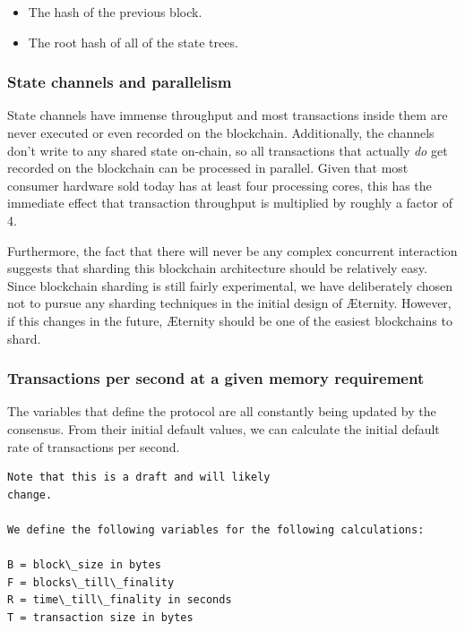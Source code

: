\documentclass[a4paper, 10pt, conference]{ieeeconf}      %
\begin{document}
\begin{draft}
\begin{itemize}
\item The hash of the previous block.
\item The root hash of all of the state trees.
\end{itemize}

\subsubsection{State channels and parallelism}
State channels have immense throughput and most transactions inside them are never executed or even recorded on the blockchain. Additionally, the channels don't write to any shared state on-chain, so all transactions that actually \emph{do} get recorded on the blockchain can be processed in parallel. Given that most consumer hardware sold today has at least four processing cores, this has the immediate effect that transaction throughput is multiplied by roughly a factor of 4.

Furthermore, the fact that there will never be any complex concurrent interaction suggests that sharding this blockchain architecture should be relatively easy. Since blockchain sharding is still fairly experimental, we have deliberately chosen not to pursue any sharding techniques in the initial design of Æternity. However, if this changes in the future, Æternity should be one of the easiest blockchains to shard.


\begin{sketch}
\subsubsection{Transactions per second at a given memory requirement}
The variables that define the protocol are all constantly being updated by the consensus. From their initial default values, we can calculate the initial default rate of transactions per second. 



\begin{lstlisting}
Note that this is a draft and will likely 
change. 

We define the following variables for the following calculations:

B = block\_size in bytes
F = blocks\_till\_finality
R = time\_till\_finality in seconds
T = transaction size in bytes


\end{lstlisting}
\end{sketch}
\end{draft}
\end{document}
